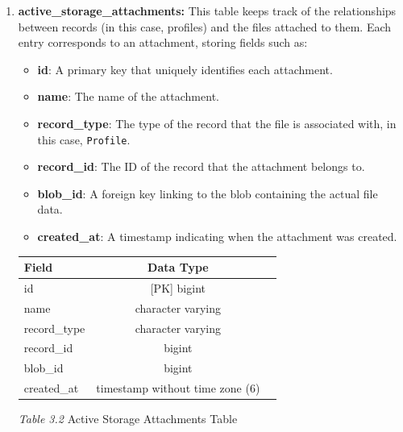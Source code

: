 \begin{enumerate}
        \begin{enumerate}
            \item \textbf{active\_storage\_attachments:} This table keeps track of the relationships between records (in this case, profiles) and the files attached to them. Each entry corresponds to an attachment, storing fields such as:
            \begin{itemize}
                \item \textbf{id}: A primary key that uniquely identifies each attachment.
                \item \textbf{name}: The name of the attachment.
                \item \textbf{record\_type}: The type of the record that the file is associated with, in this case, \texttt{Profile}.
                \item \textbf{record\_id}: The ID of the record that the attachment belongs to.
                \item \textbf{blob\_id}: A foreign key linking to the blob containing the actual file data.
                \item \textbf{created\_at}: A timestamp indicating when the attachment was created.
            \end{itemize}

            \bigskip
            \begin{table}[h!]
            \centering
            \begin{tabular}{lcc}
                \hline
                \textbf{Field}               & \textbf{Data Type}                 \\ \hline
                id                           & [PK] bigint                        \\ 
                name                         & character varying                  \\ 
                record\_type                & character varying                  \\ 
                record\_id                  & bigint                             \\ 
                blob\_id                    & bigint                             \\ 
                created\_at                 & timestamp without time zone (6)    \\ \hline
            \end{tabular}
            
            \vspace{0.3cm} %
            \small\centerline{\textit{Table 3.2} Active Storage Attachments Table} %
            \label{tab:active_storage_attachments}
            \end{table}
        

\end{enumerate}
\end{enumerate}

